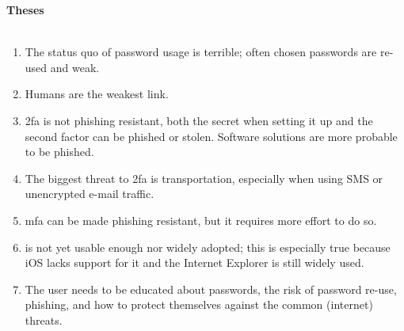 \thispagestyle{noheader}

\begin{large}
	\textbf{Theses} \\ \\
\end{large}


\begin{enumerate}
	\setlength{\itemsep}{1cm}
	\item The status quo of password usage is terrible; often chosen passwords are re-used and weak.
	\item Humans are the weakest link.
	\item \gls{2fa} is not phishing resistant, both the secret when setting it up and the second factor can be phished or stolen. Software solutions are more probable to be phished.
	\item The biggest threat to \gls{2fa} is transportation, especially when using SMS or unencrypted e-mail traffic.
	\item \gls{mfa} can be made phishing resistant, but it requires more effort to do so.
	\item \wa{} is not yet usable enough nor widely adopted; this is especially true because iOS lacks support for it and the Internet Explorer is still widely used.
	\item The user needs to be educated about passwords, the risk of password re-use, phishing, and how to protect themselves against the common (internet) threats.
\end{enumerate}
